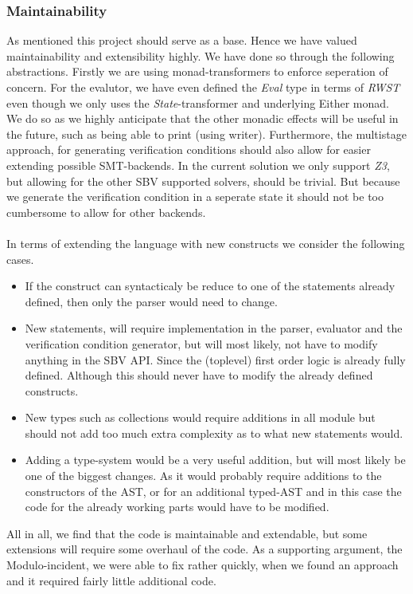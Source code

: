 \subsubsection{Maintainability}
As mentioned this project should serve as a base.
Hence we have valued maintainability and extensibility highly.
We have done so through the following abstractions.
Firstly we are using monad-transformers to enforce seperation of concern.
For the evalutor, we have even defined the \textit{Eval} type in terms of \textit{RWST} even though we only uses the \textit{State}-transformer and underlying Either monad.
We do so as we highly anticipate that the other monadic effects will be useful in the future, such as being able to print (using writer).
Furthermore, the multistage approach, for generating verification conditions should also allow for easier extending possible SMT-backends.
In the current solution we only support \textit{Z3}, but allowing for the other SBV supported solvers, should be trivial.
But because we generate the verification condition in a seperate state it should not be too cumbersome to allow for other backends.
\\~\\
In terms of extending the language with new constructs we consider the following cases.
\begin{itemize}
  \item If the construct can syntacticaly be reduce to one of the statements already defined, then only the parser would need to change.
  \item New statements, will require implementation in the parser, evaluator and the verification condition generator, but will most likely, not have to modify anything in the SBV API.
  Since the (toplevel) first order logic is already fully defined.
  Although this should never have to modify the already defined constructs.
  \item New types such as collections would require additions in all module but should not add too much extra complexity as to what new statements would.
  \item Adding a type-system would be a very useful addition, but will most likely be one of the biggest changes. As it would probably require additions to the constructors of the AST, or for an additional typed-AST and in this case the code for the already working parts would have to be modified.
\end{itemize}
All in all, we find that the code is maintainable and extendable, but some extensions will require some overhaul of the code. As a supporting argument, the Modulo-incident, we were able to fix rather quickly, when we found an approach and it required fairly little additional code.







